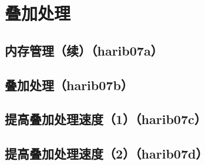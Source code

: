 ﻿\chapter{	叠加处理	}
\section{	内存管理（续）（harib07a）	}
\section{	叠加处理（harib07b）	}
\section{	提高叠加处理速度（1）（harib07c）	}
\section{	提高叠加处理速度（2）（harib07d）	}

